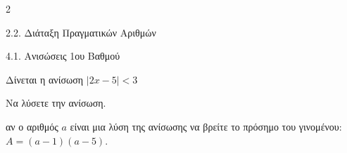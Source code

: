 \begin{ylh}{2}
    \item 2.2. Διάταξη Πραγματικών Αριθμών
    \item 4.1. Ανισώσεις 1ου Βαθμού
\end{ylh}
Δίνεται η ανίσωση $|2x - 5| < 3$
\begin{alist}
\item Να λύσετε την ανίσωση. 
\item αν ο αριθμός $a$ είναι μια λύση της ανίσωσης να βρείτε το πρόσημο του γινομένου:
 $A = (a - 1)(a - 5)$. 
\end{alist}

